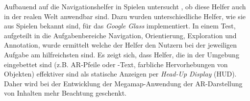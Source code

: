 Aufbauend auf die Navigationshelfer in Spielen untersucht \textcite{Lodts2015}, ob diese Helfer auch in der realen Welt anwendbar sind.
Dazu wurden unterschiedliche Helfer, wie sie aus Spielen bekannt sind, für das \emph{Google Glass} implementiert.
In einem Test, aufgeteilt in die Aufgabenbereiche Navigation, Orientierung, Exploration und Annotation, wurde ermittelt welche der Helfer den Nutzern bei der jeweiligen Aufgabe am hilfreichsten sind.
Es zeigt sich, dass Helfer, die in der Umgebung eingebettet sind (z.B. AR-Pfeile oder -Text, farbliche Hervorhebungen von Objekten) effektiver sind als statische Anzeigen per \emph{Head-Up Display} (HUD).
Daher wird bei der Entwicklung der Megamap-Anwendung der AR-Darstellung von Inhalten mehr Beachtung geschenkt.
%
\cleardoublepage
